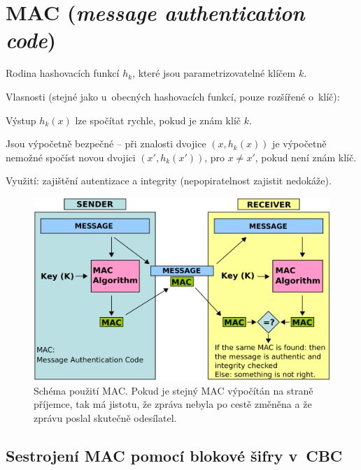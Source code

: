 
\section{MAC (\textit{message authentication code})}

\begin{compactitem}
    \item Rodina hashovacích funkcí $h_k$, které jsou parametrizovatelné klíčem $k$.
    \item Vlasnosti (stejné jako u~obecných hashovacích funkcí, pouze rozšířené o~klíč): \begin{compactitem}
        \item Výstup $h_k(x)$ lze spočítat rychle, pokud je znám klíč $k$.
        \item Jsou výpočetně bezpečné -- při znalosti dvojice $(x, h_k(x))$ je výpočetně nemožné spočíst novou dvojici $(x', h_k(x'))$, pro $x \neq x'$, pokud není znám klíč.
    \end{compactitem}
    \item Využití: zajištění autentizace a integrity (nepopiratelnost zajistit nedokáže).
\end{compactitem}

\begin{figure}[H]
    \centering
    \includegraphics[width=1\linewidth]{mac.png}
    \caption{Schéma použití MAC. Pokud je stejný MAC výpočítán na straně příjemce, tak má jistotu, že zpráva nebyla po cestě změněna a že zprávu poslal skutečně odesílatel.}
\end{figure}

\subsection{Sestrojení MAC pomocí blokové šifry v~CBC}

